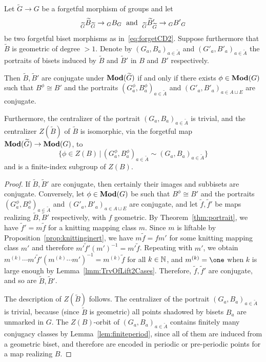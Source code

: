 \documentclass{amsart}
\newcommand\wtf{{\widetilde f}}
\newcommand\wtA{{\widetilde A}}
\newcommand\wtB{{\widetilde B}}
\newcommand\wtG{{\widetilde G}}
\begin{document}
\begin{thm}\label{thm:conjcentr}
  Let $\wtG\to G$ be a forgetful morphism of groups and let
  \[\subscript{\wtG}{\wtB}_{\wtG}\to\subscript G B_G\;\text{ and }\; \subscript{\wtG}{\wtB'}_{\wtG}\to\subscript G{B'}_G
  \]
  be two forgetful biset morphisms as in~\eqref{eq:forgetCD2}.
  Suppose furthermore that $\wtB$ is geometric of degree
  $>1$. Denote by $(G_a,B_a)_{a\in \wtA}$ and
  $(G'_a,B'_a)_{a\in \wtA}$ the portraits of bisets induced by
  $\wtB$ and $\wtB'$ in $B$ and $B'$ respectively.

  Then $\wtB,\wtB'$ are conjugate under
  $\Mod(\wtG)$ if and only if there exists $\phi\in\mathbf{\relax Mod}(G)$
  such that $B^\phi\cong B'$ and the portraits
  $(G_a^\phi,B_a^\phi)_{a\in \wtA}$ and
  $(G'_a,B'_a)_{a\in A\sqcup E}$ are conjugate.

  Furthermore, the centralizer of the portrait
  $(G_a,B_a)_{a\in\wtA}$ is trivial, and the centralizer
  $Z(\wtB)$ of $\wtB$ is isomorphic, via the forgetful
  map $\Mod(\wtG)\to\Mod(G)$, to
  \[\big\{\phi\in Z(B)
    \,\big|\,(G_a^{\phi},B_a^{\phi})_{a\in \wtA}\sim(G_a,B_a)_{a\in
    \wtA}\big\}
  \]
  and is a finite-index subgroup of $Z(B)$.
\end{thm}

\begin{proof}
  If $\wtB,\wtB'$ are conjugate, then certainly their
  images and subbisets are conjugate. Conversely, let $\phi\in\mathbf{\relax Mod}(G)$
  be such that $B^\phi\cong B'$ and the portraits
  $(G_a^\phi,B_a^\phi)_{a\in \wtA}$ and
  $(G'_a,B'_a)_{a\in A\sqcup E}$ are conjugate, and let
  $\wtf,\wtf'$ be maps realizing
  $\wtB,\wtB'$ respectively, with $f$ geometric. By
  Theorem~\ref{thm:portrait}, we have $\wtf'=m\wtf$
  for a knitting mapping class $m$. Since $m$ is liftable by
  Proposition~\ref{prop:knittinginert}, we have $m\wtf=f m'$
  for some knitting mapping class $m'$ and therefore
  $m'\wtf'(m')^{-1}=m'\wtf$. Repeating with $m'$, we
  obtain
  $m^{(k)}\cdots m'\wtf'(m^{(k)}\cdots
  m')^{-1}=m^{(k)}\wtf$ for all $k\in{\mathbb N}$, and $m^{(k)}=\one$
  when $k$ is large enough by
  Lemma~\ref{lmm:TrvOfLift2Cases}. Therefore,
  $\wtf,\wtf'$ are conjugate, and so are
  $\wtB,\wtB'$.

  The description of $Z(\wtB)$ follows. The centralizer of the
  portrait $(G_a,B_a)_{a\in\wtA}$ is trivial, because (since
  $\wtB$ is geometric) all points shadowed by bisets $B_a$ are
  unmarked in $G$.  The $Z(B)$-orbit of $(G_a,B_a)_{a\in\wtA}$
  contains finitely many conjugacy classes by
  Lemma~\ref{lem:finiteperiod}, since all of them are induced from a
  geometric biset, and therefore are encoded in periodic
  or pre-periodic points for a map realizing $B$.
\end{proof}
\end{document}
